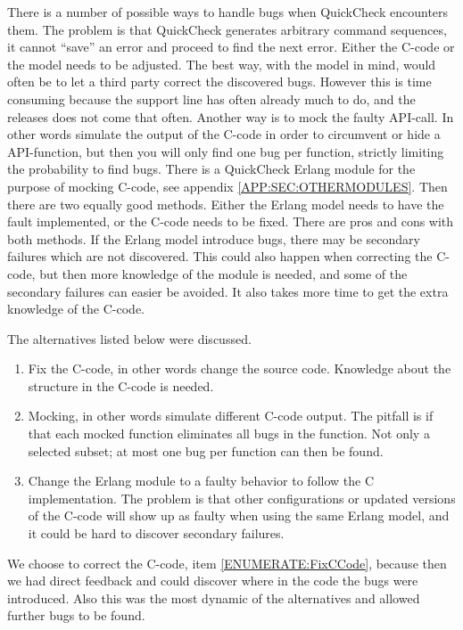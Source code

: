 There is a number of possible ways to handle bugs when QuickCheck
encounters them. The problem is that QuickCheck generates arbitrary
command sequences, it cannot ``save'' an error and proceed to find the
next error. Either the C-code or the model needs to be adjusted.  The
best way, with the model in mind, would often be to let a third party
correct the discovered bugs. However this is time consuming because
the support line has often already much to do, and the releases
does not come that often.  Another way is to mock the faulty
API-call. In other words simulate the output of the C-code in order to
circumvent or hide a API-function, but then you will only find one bug
per function, strictly limiting the probability to find bugs. There is
a QuickCheck Erlang module for the purpose of mocking C-code, see
appendix \ref{APP:SEC:OTHERMODULES}. Then there are two equally good
methods. Either the Erlang model needs to have the fault implemented,
or the C-code needs to be fixed. There are pros and cons with both
methods. If the Erlang model introduce bugs, there may be secondary
failures which are not discovered. This could also happen when
correcting the C-code, but then more knowledge of the module is
needed, and some of the secondary failures can easier be avoided. It
also takes more time to get the extra knowledge of the C-code.

The alternatives listed below were discussed.

\begin{enumerate}
  \item Fix the C-code, in other words change the source
    code. Knowledge about the structure in the C-code is needed.
    \label{ENUMERATE:FixCCode}
  \item Mocking, in other words simulate different C-code output. The
    pitfall is if that each mocked function eliminates all bugs in the
    function. Not only a selected subset; at most one bug per function
    can then be found.
  \item Change the Erlang module to a faulty behavior to follow the C
    implementation. The problem is that other configurations or
    updated versions of the C-code will show up as faulty when using
    the same Erlang model, and it could be hard to discover secondary
    failures.
\end{enumerate}

We choose to correct the C-code, item \ref{ENUMERATE:FixCCode},
because then we had direct feedback and could discover where in the
code the bugs were introduced. Also this was the most dynamic of the
alternatives and allowed further bugs to be found.

